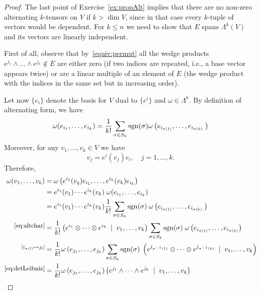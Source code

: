 \begin{proof}
  The last point of Exercise~\ref{ex:propAlt} implies that there are no non-zero alternating $k$-tensors on $V$ if $k >\dim V$, since in that case every $k$-tuple of vectors would be dependent.
  For $k\leq n$ we need to show that $E$ spans $\Lambda^k(V)$ and its vectors are linearly independent.
  
  First of all, observe that by~\eqref{equiv:permut} all the wedge products ${e^{j_1}\wedge\ldots\wedge e^{j_k}\not\in E}$ are either zero (if two indices are repeated, i.e., a base vector appears twice) or are a linear multiple of an element of $E$ (the wedge product with the indices in the same set but in increasing order).

  Let now $\{e_i\}$ denote the basis for $V$ dual to $\{e^i\}$ and $\omega\in\Lambda^k$.
  By definition of alternating form, we have
  \begin{equation}\label{eq:altchar}
    \omega(e_{i_1}, \ldots, e_{i_k}) = \frac1{k!} \sum_{\sigma\in S_k}\operatorname{sgn}(\sigma) \omega\left(e_{i_{\sigma(1)}}, \ldots, e_{i_{\sigma(k).}}\right)
  \end{equation}
  Moreover, for any $v_1,\ldots,v_k\in V$ we have
  \begin{equation}
    v_j = e^i(v_j) e_i, \quad j=1,\ldots, k.
  \end{equation}
  Therefore,
  \begin{align}
    \omega(v_1, \ldots, v_k)
    &=\omega\left(e^{i_1}(v_q) e_{i_1}, \ldots, e^{i_k}(v_k) e_{i_k}\right)\\
    &=e^{i_1}(v_1)\cdots e^{i_k}(v_k)\; \omega(e_{i_1}, \ldots, e_{i_k})\\
    &=e^{i_1}(v_1)\cdots e^{i_k}(v_k) \frac1{k!} \sum_{\sigma\in S_k}\sgn(\sigma)\; \omega\left(e_{i_{\sigma(1)}}, \ldots, e_{i_{\sigma(k).}}\right) \\
    \overset{\mbox{\small\eqref{eq:altchar}}}{}
    &= \frac1{k!} \left(e^{i_1}\otimes \cdots \otimes e^{i_k} \;\mid\; v_1, \ldots, v_k\right) \sum_{\sigma\in S_k}\sgn(\sigma)\; \omega\left(e_{i_{\sigma(1)}}, \ldots, e_{i_{\sigma(k)}}\right) \\
    \overset{[i_{\sigma(l)} \mapsto j_l]}{}
    &= \frac1{k!} \omega\left(e_{j_1}, \ldots, e_{j_k}\right) \sum_{\sigma\in S_k} \sgn(\sigma) \;\left(e^{j_{\sigma^{-1}(1)}}\otimes \cdots \otimes e^{j_{\sigma^{-1}(k)}} \;\mid\; v_1, \ldots, v_k\right)\\
    \overset{\mbox{\small\eqref{eq:detLeibniz}}}{}
    &= \frac1{k!} \omega\left(e_{j_1}, \ldots, e_{j_k}\right) \left( e^{j_1}\wedge \cdots \wedge e^{j_k} \;\mid\; v_1, \ldots, v_k\right) \\

\end{align}
\end{proof}
